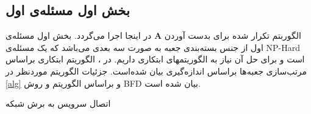 \subsection{بخش اول مسئله‌ی اول}\label{firstsub}
الگوربتم تکرار شده برای بدست آوردن $\boldsymbol{A}$ در اینجا اجرا می‌گردد. بخش اول مسئله‌ی اول از جنس بسته‌بندی جعبه به صورت سه بعدی می‌باشد که یک مسئله‌ی NP-Hard است و برای حل آن نیاز به الگوریتمهای ابتکاری داریم.
در 
\cite{3dbin}،
الگوریتم ابتکاری براساس مرتب‌سازی جعبه‌ها براساس اندازه‌گیری بیان شده‌است. جزئیات الگوریتم موردنظر در \ref{alg}
و براساس الگوریتم
 \cite{3dbin}
 و روش
  BFD
  بیان شده است.

	\begin{algorithm}
		\caption{اتصال سرویس به برش شبکه}\label{alg}
		\begin{latin}
		\begin{algorithmic}[1]
			
			\Else
			\EndIf
			\EndFor
			\EndFor
		\end{algorithmic}
	\end{latin}
	\end{algorithm}


